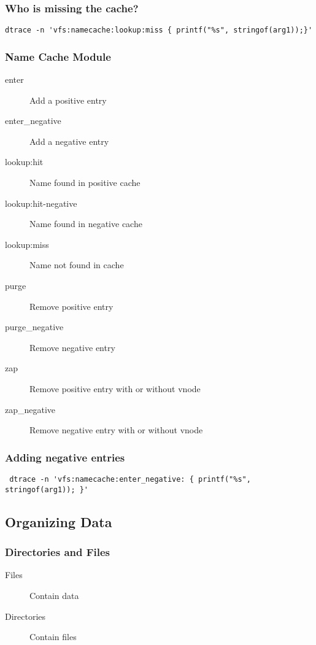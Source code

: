 \documentclass[pdftex]{beamer} %
\begin{document}
\begin{frame}[fragile]
  \frametitle{Who is missing the cache?}
\begin{lstlisting}
dtrace -n 'vfs:namecache:lookup:miss { printf("%s", stringof(arg1));}'
\end{lstlisting}
\end{frame}

\begin{frame}[fragile]
  \frametitle{Name Cache Module}
  \begin{description}
  \item[enter] Add a positive entry
  \item[enter\_negative] Add a negative entry
  \item[lookup:hit] Name found in positive cache
  \item[lookup:hit-negative] Name found in negative cache
  \item[lookup:miss] Name not found in cache
  \item[purge] Remove positive entry
  \item[purge\_negative] Remove negative entry
  \item[zap] Remove positive entry with or without vnode
  \item[zap\_negative] Remove negative entry with or without vnode
  \end{description}
\end{frame}

\begin{frame}[fragile]
  \frametitle{Adding negative entries}
\begin{lstlisting}
 dtrace -n 'vfs:namecache:enter_negative: { printf("%s", stringof(arg1)); }'
\end{lstlisting}
\end{frame}


\subsection{Organizing Data}
\label{sec:organization}

\begin{frame}
  \frametitle{Directories and Files}
  \begin{description}
  \item [Files] Contain data
  \item[Directories] Contain files
  \end{description}
\end{frame}
\end{document}
